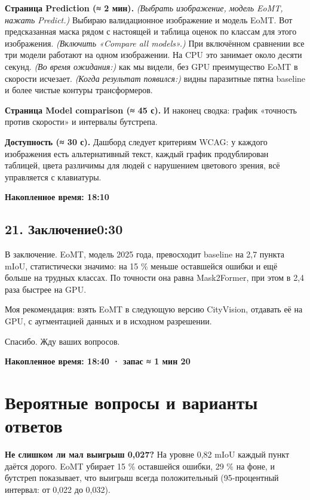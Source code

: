 \documentclass[11pt,a4paper]{article}
\newcommand{\didascalie}[1]{{\color{bodyc}\itshape #1}}
\newcommand{\cumul}[1]{\par{\hfill\small\color{accent}\bfseries #1}\par}
\newcommand{\tempo}[1]{\hfill{\normalsize\color{accent}#1}}
\begin{document}
\textbf{Страница Prediction (≈ 2 мин).}
\didascalie{(Выбрать изображение, модель EoMT, нажать Predict.)} Выбираю валидационное изображение и модель EoMT. Вот предсказанная маска рядом с настоящей и таблица оценок по классам для этого изображения. \didascalie{(Включить «Compare all models».)} При включённом сравнении все три модели работают на одном изображении. На CPU это занимает около десяти секунд. \didascalie{(Во время ожидания:)} как мы видели, без GPU преимущество EoMT в скорости исчезает. \didascalie{(Когда результат появился:)} видны паразитные пятна baseline и более чистые контуры трансформеров.

\textbf{Страница Model comparison (≈ 45 с).}
И наконец сводка: график «точность против скорости» и интервалы бутстрепа.

\textbf{Доступность (≈ 30 с).}
Дашборд следует критериям WCAG: у каждого изображения есть альтернативный текст, каждый график продублирован таблицей, цвета различимы для людей с нарушением цветового зрения, всё управляется с клавиатуры.

\cumul{Накопленное время: 18:10}

\subsection*{21. Заключение\tempo{0:30}}

В заключение. EoMT, модель 2025 года, превосходит baseline на 2,7 пункта mIoU, статистически значимо: на 15 \% меньше оставшейся ошибки и ещё больше на трудных классах. По точности она равна Mask2Former, при этом в 2,4 раза быстрее на GPU.

Моя рекомендация: взять EoMT в следующую версию CityVision, отдавать её на GPU, с аугментацией данных и в исходном разрешении.

Спасибо. Жду ваших вопросов.

\cumul{Накопленное время: 18:40 · запас ≈ 1 мин 20}

\medskip{\color{linec}\rule{\linewidth}{0.5pt}}\medskip

\section*{Вероятные вопросы и варианты ответов}

\textbf{Не слишком ли мал выигрыш 0,027?}
На уровне 0,82 mIoU каждый пункт даётся дорого. EoMT убирает 15 \% оставшейся ошибки, 29 \% на фоне, и бутстреп показывает, что выигрыш всегда положительный (95-процентный интервал: от 0,022 до 0,032).
\end{document}

